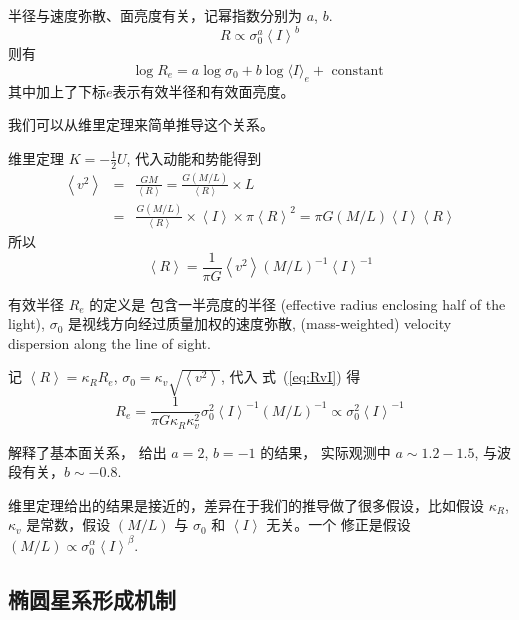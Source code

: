 \documentclass[12pt]{ctexart}
\newcommand{\refeq}[1]{式~(\ref{#1})}
\begin{document}
半径与速度弥散、面亮度有关，记幂指数分别为 $a$, $b$. 
\begin{equation}
    R\propto \sigma_0^a \left\langle I \right\rangle ^b
\end{equation} 
则有
\begin{equation}
    \log R_{e}=a \log \sigma_{0}+b \log \langle I\rangle_{e}+\text { constant }
\end{equation}
其中加上了下标$e$表示有效半径和有效面亮度。

我们可以从维里定理来简单推导这个关系。

维里定理
$K = -\frac{1}{2}U$,
代入动能和势能得到
\begin{eqnarray}
        \left\langle v^2 \right\rangle &=& \frac{GM}{\left\langle R \right\rangle } = \frac{G(M/L)}{\left\langle R \right\rangle} \times L \\ 
        &=& \frac{G(M/L)}{\left\langle R \right\rangle} \times \left\langle I \right\rangle \times \pi \left\langle R \right\rangle ^2 = \pi G (M/L) \left\langle I \right\rangle \left\langle R \right\rangle
\end{eqnarray}
所以
\begin{equation} \label{eq:RvI}
    \left\langle R \right\rangle = \frac{1}{\pi G} \left\langle v^2 \right\rangle (M/L)^{-1} \left\langle I \right\rangle ^{-1}
\end{equation}

有效半径 $R_e$ 的定义是 包含一半亮度的半径 (effective radius enclosing half of the light),  
$\sigma_0$ 是视线方向经过质量加权的速度弥散, (mass-weighted) velocity dispersion along the line of sight.

记
$\left\langle R \right\rangle = \kappa_R R_e $,
$\sigma_0 = \kappa_v \sqrt{\left\langle v^2 \right\rangle } $,
代入 \refeq{eq:RvI} 得
\begin{equation}
    R_e = \frac{1 }{\pi G \kappa_R \kappa_v^2} \sigma_0^2 \left\langle I \right\rangle ^{-1} (M/L)^{-1} \propto \sigma_0^2 \left\langle I \right\rangle ^{-1} 
\end{equation}

解释了基本面关系，
给出 $a=2$, $b=-1$ 的结果，
实际观测中 $a\sim 1.2-1.5$, 与波段有关，$b\sim -0.8$.

维里定理给出的结果是接近的，差异在于我们的推导做了很多假设，比如假设 $\kappa_R$, $\kappa_v$ 是常数，假设 $(M/L)$ 与 $\sigma_0$ 和 $\left\langle I \right\rangle$ 无关。一个
修正是假设 $(M/L) \propto \sigma_0^\alpha \left\langle I \right\rangle ^\beta$.

\subsection{椭圆星系形成机制}
\end{document}
